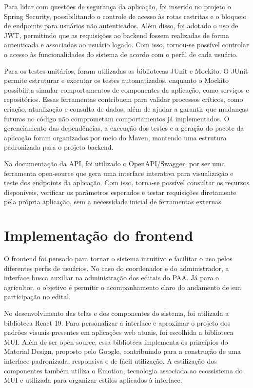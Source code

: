 \documentclass[grad,pdftex]{poli}
\begin{document}
Para lidar com questões de segurança da aplicação, foi inserido no projeto o Spring Security, possibilitando o controle de acesso às rotas restritas e o bloqueio de endpoints para usuários não autenticados. Além disso, foi adotado o uso de JWT, permitindo que as requisições ao backend fossem realizadas de forma autenticada e associadas ao usuário logado. Com isso, tornou-se possível controlar o acesso às funcionalidades do sistema de acordo com o perfil de cada usuário.

Para os testes unitários, foram utilizadas as bibliotecas JUnit e Mockito. O JUnit permite estruturar e executar os testes automatizados, enquanto o Mockito possibilita simular comportamentos de componentes da aplicação, como serviços e repositórios. Essas ferramentas contribuem para validar processos críticos, como criação, atualização e consulta de dados, além de ajudar a garantir que mudanças futuras no código não comprometam comportamentos já implementados. O gerenciamento das dependências, a execução dos testes e a geração do pacote da aplicação foram organizados por meio do Maven, mantendo uma estrutura padronizada para o projeto backend.

Na documentação da API, foi utilizado o OpenAPI/Swagger, por ser uma ferramenta open-source que gera uma interface interativa para visualização e teste dos endpoints da aplicação. Com isso, torna-se possível consultar os recursos disponíveis, verificar os parâmetros esperados e testar requisições diretamente pela própria aplicação, sem a necessidade inicial de ferramentas externas. 

\section{Implementação do frontend}

O frontend foi pensado para tornar o sistema intuitivo e facilitar o uso pelos diferentes perfis de usuários. No caso do coordenador e do administrador, a interface busca auxiliar na administração dos editais do PAA. Já para o agricultor, o objetivo é permitir o acompanhamento claro do andamento de sua participação no edital.

No desenvolvimento das telas e dos componentes do sistema, foi utilizada a biblioteca React 19. Para personalizar a interface e aproximar o projeto dos padrões visuais presentes em aplicações web atuais, foi escolhida a biblioteca MUI. Além de ser open-source, essa biblioteca implementa os princípios do Material Design, proposto pelo Google, contribuindo para a construção de uma interface padronizada, responsiva e de fácil utilização. A estilização dos componentes também utiliza o Emotion, tecnologia associada ao ecossistema do MUI e utilizada para organizar estilos aplicados à interface.
\end{document}
